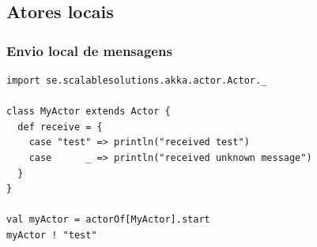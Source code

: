 \documentclass{beamer}
\begin{document}
\subsection{Atores locais}
\begin{frame}[fragile]
\frametitle{Envio local de mensagens}
\begin{verbatim}
import se.scalablesolutions.akka.actor.Actor._

class MyActor extends Actor {
  def receive = {
    case "test" => println("received test")
    case      _ => println("received unknown message")
  }
}
	    
val myActor = actorOf[MyActor].start
myActor ! "test"
\end{verbatim}
\end{frame}
\end{document}
